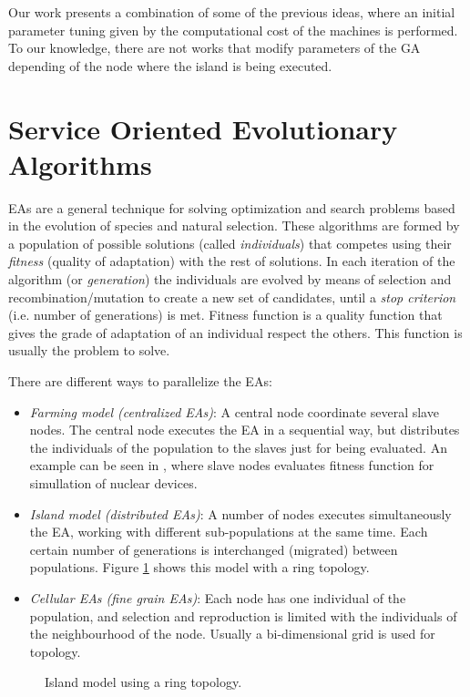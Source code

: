  Our work presents a combination of some of the previous ideas, where an initial parameter tuning given by the computational cost of the machines is performed. To our knowledge, there are not works that modify parameters of the GA depending of the node where the island is being executed.


\section{Service Oriented Evolutionary Algorithms}
\label{sec:soaea}
EAs are a general technique for solving optimization and search problems based in the evolution of species and natural selection. These algorithms are formed by a population of possible solutions (called {\em individuals}) that competes using their {\em fitness} (quality of adaptation) with the rest of solutions. In each iteration of the algorithm (or {\em generation}) the individuals are evolved by means of selection and recombination/mutation to create a new set of candidates, until a {\em stop criterion} (i.e. number of generations) is met. Fitness function is a quality function that gives the grade of adaptation of an individual respect the others. This function is usually the problem to solve. 

There are different ways to parallelize the EAs:

\begin{itemize}
\item {\em Farming model (centralized EAs)}: A central node coordinate several slave nodes. The central node executes the EA in a sequential way, but distributes the individuals of the population to the slaves just for being evaluated. An example can be seen in \cite{NUCLEAR}, where slave nodes evaluates fitness function for simullation of nuclear devices.
\item {\em Island model (distributed EAs)}: A number of nodes executes simultaneously the EA, working with different sub-populations at the same time. Each certain number of generations is interchanged (migrated) between populations. Figure \ref{fig:islands} shows this model with a ring topology.
\item {\em Cellular EAs (fine grain EAs)}: Each node has one individual of the population, and selection and reproduction is limited with the individuals of the neighbourhood of the node. Usually a bi-dimensional grid is used for topology.
\end{itemize}

\begin{figure}
\centering
{}
\caption{Island model using a ring topology.}
\label{fig:islands}
\end{figure}


